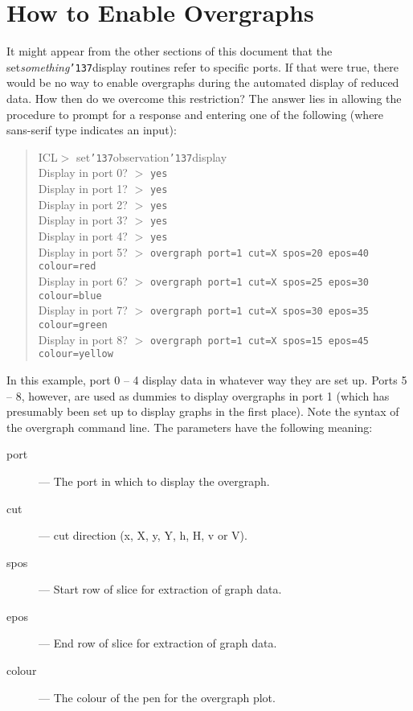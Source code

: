 \documentclass[a4paper]{book}
\renewcommand{\_}{{\tt\char'137}}
\begin{document}
\section{How to Enable Overgraphs}
It might appear from the other sections of this document that the 
set{\em something}\_display routines refer to specific ports. If that were true, 
there would be no way to enable overgraphs during the automated display 
of reduced data. How then do we overcome this restriction? The answer lies 
in allowing the procedure to prompt for a response and entering one of 
the following (where sans-serif type indicates an input):
\begin{quote}
ICL$>$ set\_observation\_display \\
Display in port 0?  $>$ {\tt yes} \\
Display in port 1?  $>$ {\tt yes} \\
Display in port 2?  $>$ {\tt yes} \\
Display in port 3?  $>$ {\tt yes} \\
Display in port 4?  $>$ {\tt yes} \\
Display in port 5?  $>$ {\tt overgraph port=1 cut=X spos=20 epos=40 colour=red} \\
Display in port 6?  $>$ {\tt overgraph port=1 cut=X spos=25 epos=30 colour=blue} \\
Display in port 7?  $>$ {\tt overgraph port=1 cut=X spos=30 epos=35 colour=green} \\
Display in port 8?  $>$ {\tt overgraph port=1 cut=X spos=15 epos=45 colour=yellow}
\end{quote}

In this example, port 0 -- 4 display data in whatever way they are set
up. Ports 5 -- 8, however, are used as dummies to display overgraphs in
port 1 (which has presumably been set up to display graphs in the first
place). Note the syntax of the overgraph command line. The parameters
have the following meaning:

\begin{description}
\item[{\sc port}]--- The port in which to display the overgraph.
\item[{\sc cut}]--- cut direction (x, X, y, Y, h, H, v or V).
\item[{\sc spos}]--- Start row of slice for extraction of graph data.
\item[{\sc epos}]--- End row of slice for extraction of graph data.
\item[{\sc colour}]--- The colour of the pen for the overgraph plot.
\end{description}
\end{document}
